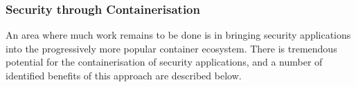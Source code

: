 



\subsubsection{Security through Containerisation} \label{SecurityThroughContainerisation}
An area where much work remains to be done is in bringing security applications into the progressively more popular container ecosystem. There is tremendous potential for the containerisation of security applications, and a number of identified benefits of this approach are described below.

